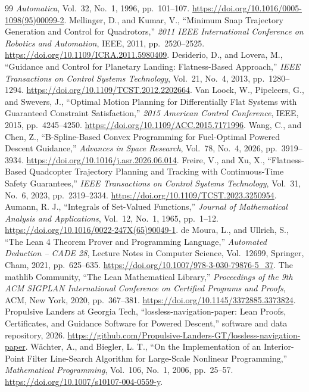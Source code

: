 \begin{thebibliography}{99}
\emph{Automatica}, Vol.~32, No.~1, 1996, pp.~101--107. \url{https://doi.org/10.1016/0005-1098(95)00099-2}.
 Mellinger, D., and Kumar, V., ``Minimum Snap Trajectory Generation and Control for Quadrotors,''
\emph{2011 IEEE International Conference on Robotics and Automation}, IEEE, 2011, pp.~2520--2525. \url{https://doi.org/10.1109/ICRA.2011.5980409}.
 Desiderio, D., and Lovera, M., ``Guidance and Control for Planetary Landing: Flatness-Based Approach,''
\emph{IEEE Transactions on Control Systems Technology}, Vol.~21, No.~4, 2013, pp.~1280--1294. \url{https://doi.org/10.1109/TCST.2012.2202664}.
 Van Loock, W., Pipeleers, G., and Swevers, J., ``Optimal Motion Planning for Differentially Flat Systems with
Guaranteed Constraint Satisfaction,'' \emph{2015 American Control Conference}, IEEE, 2015, pp.~4245--4250. \url{https://doi.org/10.1109/ACC.2015.7171996}.
 Wang, C., and Chen, Z., ``B-Spline-Based Convex Programming for Fuel-Optimal Powered Descent Guidance,''
\emph{Advances in Space Research}, Vol.~78, No.~4, 2026, pp.~3919--3934. \url{https://doi.org/10.1016/j.asr.2026.06.014}.
 Freire, V., and Xu, X., ``Flatness-Based Quadcopter Trajectory Planning and Tracking with Continuous-Time
Safety Guarantees,'' \emph{IEEE Transactions on Control Systems Technology}, Vol.~31, No.~6, 2023, pp.~2319--2334.
\url{https://doi.org/10.1109/TCST.2023.3250954}.
 Aumann, R. J., ``Integrals of Set-Valued Functions,'' \emph{Journal of Mathematical Analysis and Applications},
Vol.~12, No.~1, 1965, pp.~1--12. \url{https://doi.org/10.1016/0022-247X(65)90049-1}.
 de Moura, L., and Ullrich, S., ``The Lean 4 Theorem Prover and Programming Language,'' \emph{Automated Deduction --
CADE 28}, Lecture Notes in Computer Science, Vol.~12699, Springer, Cham, 2021, pp.~625--635. \url{https://doi.org/10.1007/978-3-030-79876-5_37}.
 The mathlib Community, ``The Lean Mathematical Library,'' \emph{Proceedings of the 9th ACM SIGPLAN International
Conference on Certified Programs and Proofs}, ACM, New York, 2020, pp.~367--381. \url{https://doi.org/10.1145/3372885.3373824}.
 Propulsive Landers at Georgia Tech, ``lossless-navigation-paper: Lean Proofs, Certificates, and Guidance Software for
Powered Descent,'' software and data repository, 2026. \url{https://github.com/Propulsive-Landers-GT/lossless-navigation-paper}.
 W\"achter, A., and Biegler, L. T., ``On the Implementation of an Interior-Point Filter Line-Search Algorithm for
Large-Scale Nonlinear Programming,'' \emph{Mathematical Programming}, Vol.~106, No.~1, 2006, pp.~25--57. \url{https://doi.org/10.1007/s10107-004-0559-y}.
\end{thebibliography}

